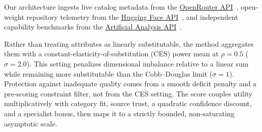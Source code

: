 \documentclass[pdflatex,sn-mathphys-num]{sn-jnl}
\theoremstyle{thmstyleone}
\theoremstyle{thmstylethree}
\begin{document}
Our architecture ingests live catalog metadata from the \href{https://openrouter.ai/docs/api-reference/overview}{OpenRouter API}~\cite{openrouter2024}, open-weight repository telemetry from the \href{https://huggingface.co/docs/hub/api}{Hugging Face API}~\cite{hf2023}, and independent capability benchmarks from the \href{https://artificialanalysis.ai/api-reference}{Artificial Analysis API}~\cite{aa2024}.

Rather than treating attributes as linearly substitutable, the method aggregates them with a constant-elasticity-of-substitution (CES) power mean at $\rho=0.5$ ($\sigma=2.0$). This setting penalizes dimensional imbalance relative to a linear sum while remaining more substitutable than the Cobb--Douglas limit ($\sigma=1$). Protection against inadequate quality comes from a smooth deficit penalty and a pre-scoring constraint filter, not from the CES setting. The score couples utility multiplicatively with category fit, source trust, a quadratic confidence discount, and a specialist bonus, then maps it to a strictly bounded, non-saturating asymptotic scale.
\end{document}
